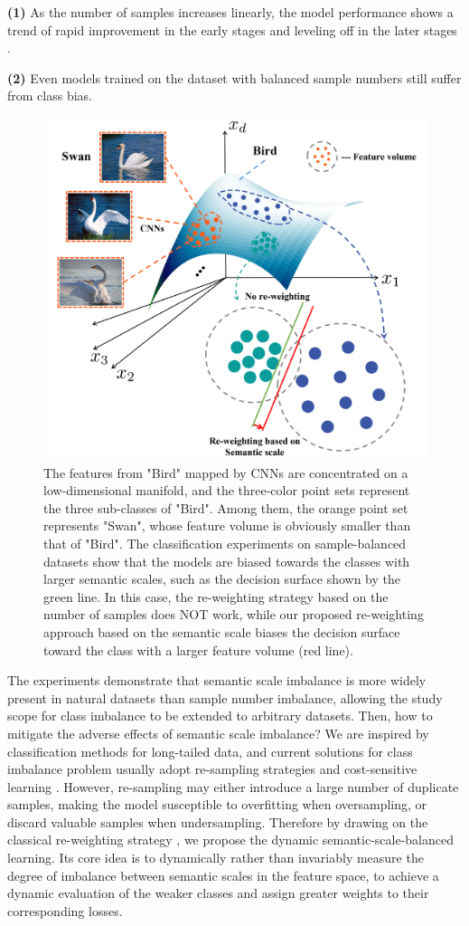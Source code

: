 \documentclass[10pt]{article} %
\begin{document}
 \textbf{(1)} As the number of samples increases linearly, the model performance shows a trend of rapid improvement in the early stages and leveling off in the later stages \cite {paper22}. 
 
 \textbf{(2)} Even models trained on the dataset with balanced sample numbers still suffer from class bias.


\begin{figure} %
\begin{center}
\vskip -0.25in
\includegraphics[width=0.45\columnwidth]{fig1}
\vskip -0.1in
\caption{The features from "Bird" mapped by CNNs are concentrated on a low-dimensional manifold, and the three-color point sets represent the three sub-classes of "Bird". Among them, the \textcolor[RGB]{255,94,30}{orange} point set represents "Swan", whose feature volume is obviously smaller than that of "Bird". The classification experiments on sample-balanced datasets show that the models are biased towards the classes with larger semantic scales, such as the decision surface shown by the \textcolor[RGB]{112,173,71}{green} line. In this case, the re-weighting strategy based on the number of samples does NOT work, while our proposed re-weighting approach based on the semantic scale biases the decision surface toward the class with a larger feature volume (\textcolor[RGB]{255,0,0}{red} line).}
\label{fig1}
\end{center}
\end{figure}

The experiments demonstrate that semantic scale imbalance is more widely present in natural datasets than sample number imbalance, allowing the study scope for class imbalance to be extended to arbitrary datasets. Then, how to mitigate the adverse effects of semantic scale imbalance? We are inspired by classification methods for long-tailed data, and current solutions for class imbalance problem usually adopt re-sampling strategies \cite{paper8,paper10,paper12} and cost-sensitive learning \cite{paper16,paper17,paper18}. However, re-sampling may either introduce a large number of duplicate samples, making the model susceptible to overfitting when oversampling, or discard valuable samples when undersampling. Therefore by drawing on the classical re-weighting strategy \cite {paper24}, we propose the dynamic semantic-scale-balanced learning. Its core idea is to dynamically rather than invariably measure the degree of imbalance between semantic scales in the feature space, to achieve a dynamic evaluation of the weaker classes and assign greater weights to their corresponding losses.
\end{document}
